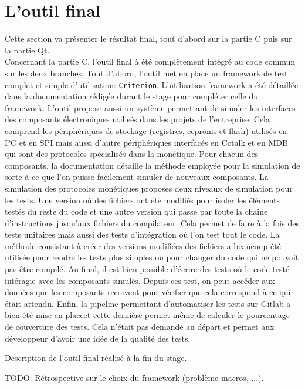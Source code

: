 \documentclass[a4paper]{article}
\begin{document}
\section{L'outil final}

Cette section va présenter le résultat final, tout d'abord sur la partie C puis
sur la partie Qt.\\

Concernant la partie C, l'outil final à été complètement intégré au code commun
sur les deux branches. Tout d'abord, l'outil met en place un framework de test
complet et simple d'utilisation: \verb|Criterion|. L'utilisation framework a été
détaillée dans la documentation rédigée durant le stage pour compléter celle du
framework. L'outil propose aussi un système permettant de simuler les interfaces
des composants électroniques utilisés dans les projets de l'entreprise. Cela
comprend les périphériques de stockage (registres, eeproms et flash) utilisés en
I²C et en SPI mais aussi d'autre périphériques interfacés en Cctalk et en MDB
qui sont des protocoles spécialisés dans la monétique. Pour chacun des
composants, la documentation détaille la méthode employée pour la simulation de
sorte à ce que l'on puisse facilement simuler de nouveaux composants. La
simulation des protocoles monétiques proposes deux niveaux de simulation pour
les tests. Une version où des fichiers ont été modifiés pour isoler les éléments
testés du reste du code et une autre version qui passe par toute la chaine
d'instructions jusqu'aux fichiers du compilateur. Cela permet de faire à la fois
des tests unitaires mais aussi des tests d'intégration où l'on test tout le
code. La méthode consistant à créer des versions modifiées des fichiers a
beaucoup été utilisée pour rendre les tests plus simples ou pour changer du code
qui ne pouvait pas être compilé. Au final, il est bien possible d'écrire des
tests où le code testé intéragie avec les composants simulés. Depuis ces test,
on peut accéder aux données que les composants recoivent pour vérifier que cela
correspond à ce qui était attendu. Enfin, la pipeline permettant d'automatiser
les tests sur Gitlab a bien été mise en placeet cette dernière permet même de
calculer le pourcentage de couverture des tests. Cela n'était pas demandé au
départ et permet aux développeur d'avoir une idée de la qualité des tests.

Description de l'outil final réalisé à la fin du stage.

TODO: Rétrospective sur le choix du framework (problème macros, ...).
\end{document}
